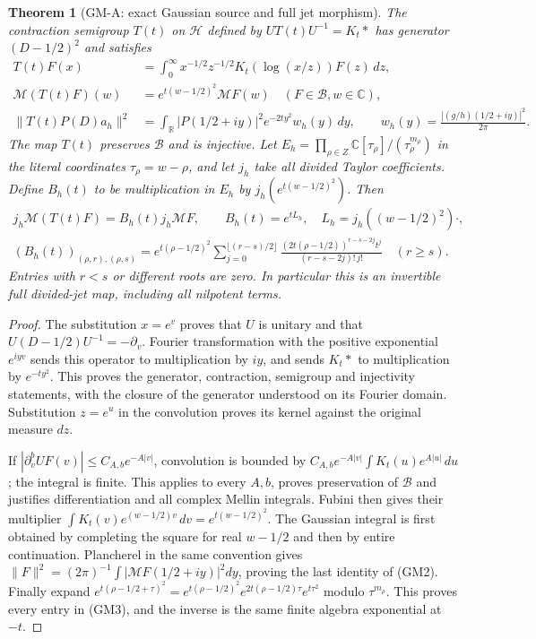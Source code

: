 \documentclass[11pt]{article}
\newtheorem{theorem}{Theorem}
\theoremstyle{remark}\newtheorem{remark}[theorem]{Remark}
\begin{document}
\begin{theorem}[GM-A: exact Gaussian source and full jet morphism]
The contraction semigroup $T(t)$ on $\mathcal H$ defined by
$UT(t)U^{-1}=K_t*$ has generator $(D-1/2)^2$ and satisfies
\begin{equation}\tag{GM2}
 \begin{split}
 T(t)F(x)&=\int_0^\infty
       x^{-1/2}z^{-1/2}K_t(\log(x/z))F(z)\,dz,\\
 \mathcal M(T(t)F)(w)&=e^{t(w-1/2)^2}\mathcal M F(w)
       \quad(F\in\mathscr B, w\in\mathbb C),\\
 \|T(t)P(D)a_h\|^2&=\int_{\mathbb R}
       |P(1/2+iy)|^2 e^{-2ty^2} w_h(y)\,dy,\qquad
 w_h(y)=\frac{|(g/h)(1/2+iy)|^2}{2\pi}.
 \end{split}
\end{equation}
The map $T(t)$ preserves $\mathscr B$ and is injective.  Let
$E_h=\prod_{\rho\in Z}\mathbb C[\tau_\rho]/(\tau_\rho^{m_\rho})$
in the literal coordinates $\tau_\rho=w-\rho$, and let $j_h$ take
all divided Taylor coefficients.  Define $B_h(t)$ to be multiplication
in $E_h$ by $j_h(e^{t(w-1/2)^2})$.  Then
\begin{equation}\tag{GM3}
 \begin{gathered}
 j_h\mathcal M(T(t)F)=B_h(t)j_h\mathcal M F,\qquad
 B_h(t)=e^{tL_h},\quad L_h=j_h((w-1/2)^2)\cdot,\\
 (B_h(t))_{(\rho,r),(\rho,s)}
 =e^{t(\rho-1/2)^2}
 \sum_{j=0}^{\lfloor(r-s)/2\rfloor}
 \frac{(2t(\rho-1/2))^{r-s-2j}t^j}{(r-s-2j)!\,j!}
 \quad(r\geq s).
 \end{gathered}
\end{equation}
Entries with $r<s$ or different roots are zero.  In particular this is
an invertible full divided-jet map, including all nilpotent terms.
\end{theorem}
\begin{proof}
The substitution $x=e^v$ proves that $U$ is unitary and that
$U(D-1/2)U^{-1}=-\partial_v$.  Fourier transformation with the
positive exponential $e^{iyv}$ sends this operator to multiplication
by $iy$, and sends $K_t*$ to multiplication by $e^{-ty^2}$.
This proves the generator, contraction, semigroup and injectivity
statements, with the closure of the generator understood on its
Fourier domain.  Substitution $z=e^u$ in the convolution proves its
kernel against the original measure $dz$.

If $|\partial_v^b UF(v)|\leq C_{A,b}e^{-A|v|}$, convolution is bounded
by $C_{A,b}e^{-A|v|}\int K_t(u)e^{A|u|}\,du$; the integral is finite.
This applies to every $A,b$, proves preservation of $\mathscr B$ and
justifies differentiation and all complex Mellin integrals.  Fubini
then gives their multiplier $\int K_t(v)e^{(w-1/2)v}\,dv
=e^{t(w-1/2)^2}$.  The Gaussian integral is first obtained by
completing the square for real $w-1/2$ and then by entire continuation.
Plancherel in the same convention gives
$\|F\|^2=(2\pi)^{-1}\int|\mathcal M F(1/2+iy)|^2dy$, proving the
last identity of (GM2).  Finally expand
$e^{t(\rho-1/2+\tau)^2}
=e^{t(\rho-1/2)^2}e^{2t(\rho-1/2)\tau}e^{t\tau^2}$
modulo $\tau^{m_\rho}$.  This proves every entry in (GM3), and the
inverse is the same finite algebra exponential at $-t$.
\end{proof}
\end{document}
